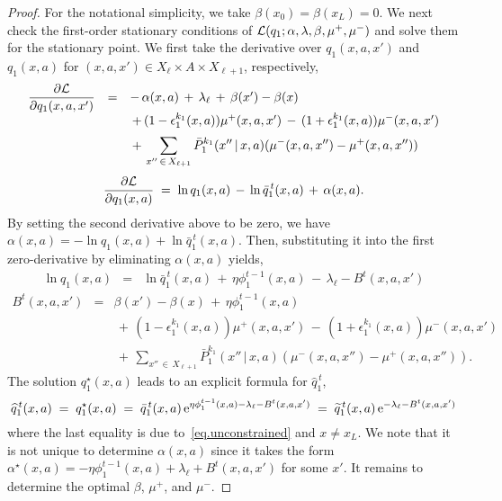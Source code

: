 \documentclass[12pt, final]{l4dc2023}
\begin{document}
\begin{proof}
	For the notational simplicity, we take $\beta(x_0)=\beta(x_L) = 0$. We next check the first-order stationary conditions of $\calL(q_1; \alpha, \lambda,\beta,\mu^+,\mu^-)$ and solve them for the stationary point. 
	We first take the derivative over $q_1(x,a,x')$ and $q_1(x,a)$ for $(x,a,x')\in X_\ell \times A\times X_{\ell+1}$, respectively,
	\[
	\begin{array}{rcl}
	\displaystyle \frac{\partial \calL}{\partial q_1(x,a,x') } &=& - \, \alpha(x,a) \,+\, \lambda_\ell \,+\, \beta(x')-\beta(x)
	\\[0.2cm]
	&& \,+\, (1-\epsilon_1^{k_1}(x,a))\mu^+(x,a,x') \,-\, (1+\epsilon_1^{k_1}(x,a))\mu^-(x,a,x')
	\\[0.2cm]
	&& \displaystyle \,+\, \sum_{x''\,\in\,X_{\ell+1}}  \bar P_1^{k_1}(x''\,\vert\,x,a) (\mu^-(x,a,x'')-\mu^+(x,a,x''))
	\end{array}
	\]
	\[
	\frac{\partial \calL}{\partial q_1(x,a) }\;=\; \ln q_1(x,a) \,-\, \ln \bar q_1^{\,t}(x,a) \,+\, \alpha(x,a).
	\] 
	By setting the second derivative above to be zero, we have $\alpha(x,a) = -\ln q_1(x,a)+\ln \bar q_1^{\,t}(x,a)$. Then, substituting it into the first zero-derivative by eliminating $\alpha(x,a)$ yields,
	\[
	\begin{array}{rcl}
	\displaystyle \ln q_1(x,a) &=& \ln \bar q_1^{\,t}(x,a) \,+\,\eta \phi_1^{t-1}(x,a) \,-\, \lambda_\ell-B^{t}(x,a,x')
	\end{array}
	\]
	\[
	\begin{array}{rcl}
	B^{t}(x,a,x') &=& \beta(x')-\beta(x) \,+\, \eta \phi_1^{t-1}(x,a)
	\\[0.2cm]
	&& \,+\, (1-\epsilon_1^{k_1}(x,a))\mu^+(x,a,x') \,-\, (1+\epsilon_1^{k_1}(x,a))\mu^-(x,a,x')
	\\[0.2cm]
	&& \displaystyle \,+\, \sum_{x''\,\in\,X_{\ell+1}}  \bar P_1^{k_1}(x''\,\vert\,x,a) (\mu^-(x,a,x'')-\mu^+(x,a,x'')).
	\end{array}
	\]
	The solution $q_1^\star(x,a)$ leads to an explicit formula for $\hat q_1^{\,t}$,
	\begin{equation}\label{eq.incomplete}
	\hat q_1^{\,t} (x,a) \;=\;q_1^\star(x,a) \;=\; \bar q_1^{\,t}(x,a) \,{\rm e}^{\eta \phi_1^{t-1}(x,a)- \lambda_\ell-B^{t}(x,a,x')}\;=\;\tilde q_1^{\,t}(x,a) \,{\rm e}^{- \lambda_\ell-B^{t}(x,a,x')}
	\end{equation}
	where the last equality is due to~\eqref{eq.unconstrained} and $x\neq x_L$. We note that it is not unique to determine $\alpha(x,a)$ since it takes the form $\alpha^\star(x,a)=-\eta \phi_1^{t-1}(x,a)+\lambda_\ell+B^{t}(x,a,x')$ for some $x'$. It remains to determine the optimal $\beta$, $\mu^+$, and $\mu^-$.
	

\end{proof}
\end{document}
